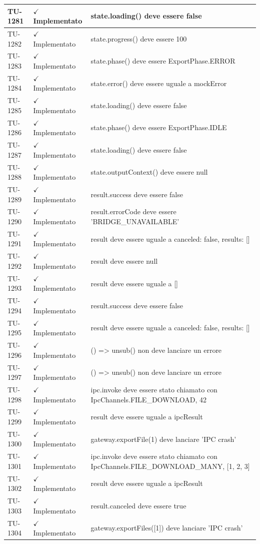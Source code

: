 ﻿\documentclass[a4paper,12pt]{article}
\newcommand{\ok}{\textcolor{green!60!black}{$\checkmark$ Implementato}}
\begin{document}
\begin{longtable}{|p{2cm}|p{3.5cm}|p{9.5cm}|}
\hline
TU-1281 & \ok & state.loading() deve essere false \\
\hline
TU-1282 & \ok & state.progress() deve essere 100 \\
\hline
TU-1283 & \ok & state.phase() deve essere ExportPhase.ERROR \\
\hline
TU-1284 & \ok & state.error() deve essere uguale a mockError \\
\hline
TU-1285 & \ok & state.loading() deve essere false \\
\hline
TU-1286 & \ok & state.phase() deve essere ExportPhase.IDLE \\
\hline
TU-1287 & \ok & state.loading() deve essere false \\
\hline
TU-1288 & \ok & state.outputContext() deve essere null \\
\hline
TU-1289 & \ok & result.success deve essere false \\
\hline
TU-1290 & \ok & result.errorCode deve essere 'BRIDGE\_UNAVAILABLE' \\
\hline
TU-1291 & \ok & result deve essere uguale a { canceled: false, results: [] } \\
\hline
TU-1292 & \ok & result deve essere null \\
\hline
TU-1293 & \ok & result deve essere uguale a [] \\
\hline
TU-1294 & \ok & result.success deve essere false \\
\hline
TU-1295 & \ok & result deve essere uguale a { canceled: false, results: [] } \\
\hline
TU-1296 & \ok & () => unsub() non deve lanciare un errore \\
\hline
TU-1297 & \ok & () => unsub() non deve lanciare un errore \\
\hline
TU-1298 & \ok & ipc.invoke deve essere stato chiamato con IpcChannels.FILE\_DOWNLOAD, 42 \\
\hline
TU-1299 & \ok & result deve essere uguale a ipcResult \\
\hline
TU-1300 & \ok & gateway.exportFile(1) deve lanciare 'IPC crash' \\
\hline
TU-1301 & \ok & ipc.invoke deve essere stato chiamato con IpcChannels.FILE\_DOWNLOAD\_MANY, [1, 2, 3] \\
\hline
TU-1302 & \ok & result deve essere uguale a ipcResult \\
\hline
TU-1303 & \ok & result.canceled deve essere true \\
\hline
TU-1304 & \ok & gateway.exportFiles([1]) deve lanciare 'IPC crash' \\

\end{longtable}
\end{document}
